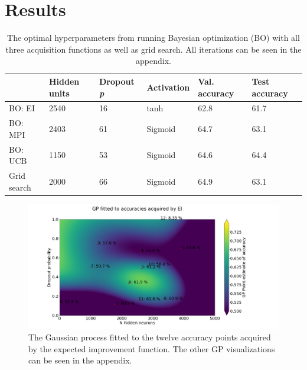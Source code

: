 \documentclass[12pt,fleqn]{article}
\begin{document}
\section{Results}
\vspace*{-0.2cm}
\begin{table}[H]\label{resultater}
	\begin{tabular}{l|lllll}
		  & Hidden units & Dropout \textit{p} & Activation & Val. accuracy &Test accuracy \\ \hline
		BO: EI  & 2540      & 16\pro              & tanh          &    62.8\pro & 61.7\pro   \\ 
		BO: MPI & 2403         & 61\pro             & Sigmoid             & 64.7\pro  & 63.1\pro     \\ 
		BO: UCB & 1150         & 53\pro              & Sigmoid             & 64.6\pro  & 64.4\pro     \\ 
		Grid search & 2000         & 66\pro              & Sigmoid             & 64.9\pro & 63.1\pro          \\
	\end{tabular}
	\caption{The optimal hyperparameters from running Bayesian optimization (BO) with all three acquisition functions as well as grid search. All iterations can be seen in the appendix.}
\end{table}
\begin{figure}
	\centering
	
	\includegraphics[width=\textwidth]{EIGP}	
	
	\caption{The Gaussian process fitted to the twelve accuracy points acquired by the expected improvement function. The other GP visualizations can be seen in the appendix.}
	\label{fig:gp}
\end{figure}
\end{document}
